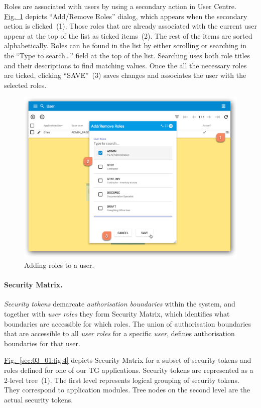 \documentclass[a4paper,12pt,oneside,openright]{memoir}
\begin{document}
	Roles are associated with users by using a secondary action in User Centre.
	\hyperref[sec:03_01:fig:3]{Fig.~\ref*{sec:03_01:fig:3}} depicts ``Add/Remove Roles'' dialog, which appears when the secondary action is clicked~(1).
	Those roles that are already associated with the current user appear at the top of the list as ticked items~(2).
	The rest of the items are sorted alphabetically.
	Roles can be found in the list by either scrolling or searching in the ``Type to search\ldots'' field at the top of the list.
	Searching uses both role titles and their descriptions to find matching values.
	Once the all the necessary roles are ticked, clicking ``SAVE''~(3) saves changes and associates the user with the selected roles.

	\begin{figure}[h!tbp]
	\centering
	\includegraphics[width=0.8\linewidth]{images/08-adding-roles-to-users.png}
	\caption{Adding roles to a user.}\label{sec:03_01:fig:3}
	\end{figure}

	\paragraph{Security Matrix.}
	\emph{Security tokens} demarcate \emph{authorisation boundaries} within the system, and together with \emph{user roles} they form Security Matrix, which identifies what boundaries are accessible for which roles.
	The union of authorisation boundaries that are accessible to all  \emph{user roles} for a specific \emph{user}, defines authorisation boundaries for that user.

	\hyperref[sec:03_01:fig:4]{Fig.~\ref*{sec:03_01:fig:4}} depicts Security Matrix for a subset of security tokens and roles defined for one of our TG applications.
	Security tokens are represented as a 2-level tree~(1).
	The first level represents logical grouping of security tokens.
	They correspond to application modules.
	Tree nodes on the second level are the actual security tokens.
\end{document}
